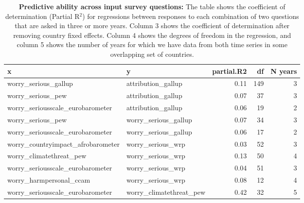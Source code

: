 \begin{table}[ht]
\centering
\begin{tabular}{llrrr}
  \hline
x & y & partial.R2 & df & N years \\ 
  \hline
worry\_serious\_gallup & attribution\_gallup & 0.11 & 149 &   3 \\ 
  worry\_serious\_pew & attribution\_gallup & 0.07 &  37 &   3 \\ 
  worry\_seriousscale\_eurobarometer & attribution\_gallup & 0.06 &  19 &   2 \\ 
  worry\_serious\_pew & worry\_serious\_gallup & 0.07 &  34 &   3 \\ 
  worry\_seriousscale\_eurobarometer & worry\_serious\_gallup & 0.06 &  17 &   2 \\ 
  worry\_countryimpact\_afrobarometer & worry\_serious\_wrp & 0.03 &  52 &   3 \\ 
  worry\_climatethreat\_pew & worry\_serious\_wrp & 0.13 &  50 &   4 \\ 
  worry\_seriousscale\_eurobarometer & worry\_serious\_wrp & 0.04 &  51 &   3 \\ 
  worry\_harmpersonal\_ccam & worry\_serious\_wrp & 0.08 &  12 &   4 \\ 
  worry\_seriousscale\_eurobarometer & worry\_climatethreat\_pew & 0.42 &  32 &   5 \\ 
   \hline
\end{tabular}
\caption{{\bf Predictive ability across input survey questions:} The table shows the coefficient of determination (Partial R$^2$) 
                    for regressions between responses to each combination of two questions that are asked in three or more years. 
                    Column 3 shows the coefficient of determination after removing country 
                  fixed effects. Column 4 shows the degrees of freedom in the regression, and column 5 shows the number of years for which we have 
                    data from both time series in some overlapping set of countries.} 
\label{tab:timeseries_inputs}
\end{table}
